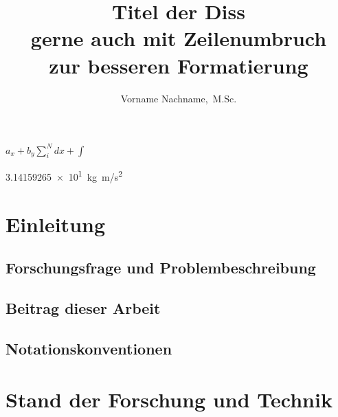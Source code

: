 \documentclass[%
english, ngerman,%
]{iswipads/iswipads} %
\title{Titel der Diss\\gerne auch mit Zeilenumbruch\\zur besseren Formatierung}
\author{Vorname Nachname,~M.Sc.}
\begin{document}
\frontmatter
\maketitle
\onehalfspacing %

\(a_x + b_y \sum_i^N dx + \int\) 

\SI{3.14159265e1}{kg.m/s^2}






\cleardoublepage
\ifpdf
\fi
\tableofcontents



\cleardoublepage
\listoffigures

\cleardoublepage
\listoftables

\mainmatter %

\chapter{Einleitung}

\section{Forschungsfrage und Problembeschreibung}
\section{Beitrag dieser Arbeit}
\section{Notationskonventionen}


\chapter{Stand der Forschung und Technik}
\end{document}
